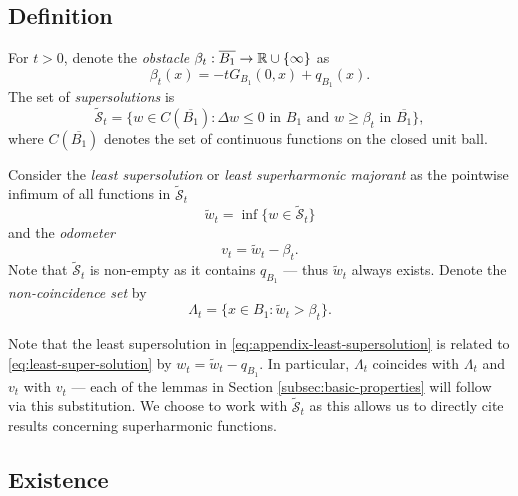 \documentclass[12pt]{amsart}
\numberwithin{equation}{section}
\newcommand{\mclSshift}[2]{\hyperref[eq:shifted-supersolutions]{\mathcal{\tilde{S}}^{#1}_{#2}}}
\newcommand{\lss}[2]{\hyperref[eq:least-super-solution]{w^{#1}_{#2}}}
\newcommand{\lssshift}[2]{\hyperref[eq:appendix-least-supersolution]{\tilde{w}^{#1}_{#2}}}
\newcommand{\cluster}[2]{\hyperref[eq:non-co-set]{\mathit{\Lambda}^{#1}_{#2}}}
\newcommand{\odometer}[2]{\hyperref[eq:limit-odometer]{v^{#1}_{#2}}}
\begin{document}
	\subsection{Definition} \label{subsec:obstacle-problem}
	For $t > 0$,  denote the {\it obstacle} $\beta_t: \overline{B_1} \to \mathbb{R} \cup \{\infty\}$ as 
	\begin{equation} \label{eq:obstacle}
	\beta_t(x) = -t G_{B_1}(0,x) + q_{B_1}(x).
	\end{equation}
	The set of  {\it supersolutions} 
	is
	\begin{equation} \label{eq:shifted-supersolutions}
	\mclSshift{}{t} = \{ w \in C(\overline{B_1}) :  \Delta w \leq 0 \mbox{ in $B_1$}  \mbox{ and }  w \geq   \beta_t \mbox{ in $\overline{B_1}$}\},
	\end{equation}
	where $C(\overline{B_1})$ denotes the set of continuous functions on the closed unit ball.
	
	Consider the {\it least supersolution} or {\it least superharmonic majorant} 
	as the pointwise infimum of all functions in $\mclSshift{}{t}$
	\begin{equation} \label{eq:appendix-least-supersolution}
	\lssshift{}{t} = \inf\{ w \in \mclSshift{}{t} \} 
	\end{equation}
	and the {\it odometer}
	\begin{equation} \label{eq:appendix-limit-odometer}
	v_t = \lssshift{}{t}  - \beta_t.
	\end{equation}
	Note that $\mclSshift{}{t}$ is non-empty as it contains $q_{B_1}$ --- thus $\lssshift{}{t}$ always exists.
	Denote the {\it non-coincidence set} by
	\begin{equation} \label{eq:appendix-non-co-set}
	\mathit{\Lambda_t} = \{ x \in B_1 : \lssshift{}{t} > \beta_t \}.
	\end{equation}
	
	Note that the least supersolution in \eqref{eq:appendix-least-supersolution} is related
	to \eqref{eq:least-super-solution} by $\lss{}{t}= \lssshift{}{t} - q_{B_1}$. In particular, $\mathit{\Lambda_t}$
	coincides with ${\cluster{}{t}}$ and $v_t$ with $\odometer{}{t}$  --- each of the lemmas in Section \ref{subsec:basic-properties} will follow via this substitution.
	We choose to work with $\mclSshift{}{t}$ as this allows us to directly cite results concerning superharmonic functions.
	
	
	
	
	
	\subsection{Existence} 
	
\end{document}
